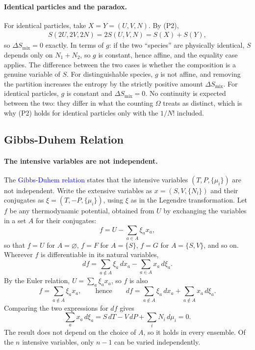 \paragraph{Identical particles and the paradox.}
For identical particles, take $X=Y=(U,V,N)$. By (P2),
\begin{align*}
    S(2U,2V,2N)=2S(U,V,N)=S(X)+S(Y),
\end{align*}
so $\Delta S_{\mathrm{mix}}=0$ exactly. In terms of $g$: if the two
``species'' are physically identical, $S$ depends only on $N_1+N_2$, so $g$
is constant, hence affine, and the equality case applies. The difference
between the two cases is whether the composition is a genuine variable of
$S$. For distinguishable species, $g$ is not affine, and removing the
partition increases the entropy by the strictly positive amount
$\Delta S_{\mathrm{mix}}$. For identical particles, $g$ is constant and
$\Delta S_{\mathrm{mix}}=0$. No continuity is expected between the two: they
differ in what the counting $\Omega$ treats as distinct, which is why (P2)
holds for identical particles only with the $1/N!$ included.

\subsection{Gibbs-Duhem Relation}

\paragraph{The intensive variables are not independent.}
The \textcolor{blue}{Gibbs-Duhem relation} states that the intensive
variables $(T,P,\{\mu_i\})$ are not independent. Write the extensive
variables as $x=(S,V,\{N_i\})$ and their conjugates as
$\xi=(T,-P,\{\mu_i\})$, using $\xi$ as in the Legendre transformation.
Let $f$ be any thermodynamic potential, obtained from $U$ by exchanging the
variables in a set $A$ for their conjugates:
\begin{equation*}
    f=U-\sum_{a\in A}\xi_a x_a,
\end{equation*}
so that $f=U$ for $A=\varnothing$, $f=F$ for $A=\{S\}$, $f=G$ for
$A=\{S,V\}$, and so on. Wherever $f$ is differentiable in its natural
variables,
\begin{equation*}
    df=\sum_{a\notin A}\xi_a\,dx_a-\sum_{a\in A}x_a\,d\xi_a.
\end{equation*}
By the Euler relation, $U=\sum_a\xi_a x_a$, so $f$ is also
\begin{equation*}
    f=\sum_{a\notin A}\xi_a x_a,
    \qquad\text{hence}\qquad
    df=\sum_{a\notin A}\xi_a\,dx_a+\sum_{a\notin A}x_a\,d\xi_a.
\end{equation*}
Comparing the two expressions for $df$ gives
\begin{equation}
    \boxed{\sum_a x_a\,d\xi_a=S\,dT-V\,dP+\sum_i N_i\,d\mu_i=0.}
\end{equation}
The result does not depend on the choice of $A$, so it holds in every
ensemble. Of the $n$ intensive variables, only $n-1$ can be varied
independently. 

